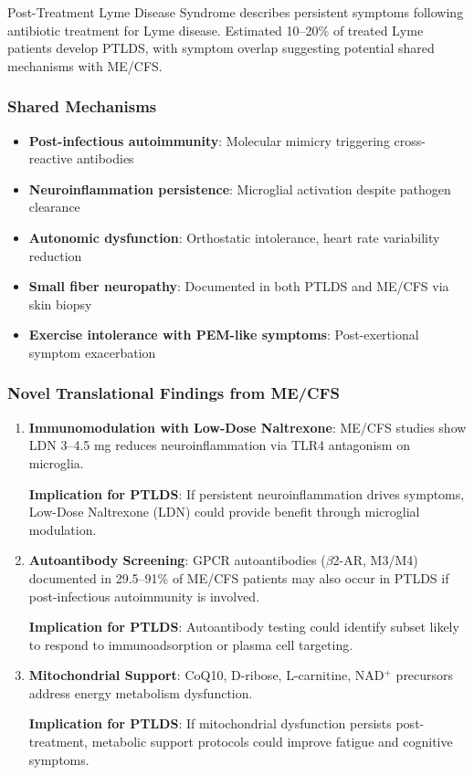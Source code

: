 Post-Treatment Lyme Disease Syndrome describes persistent symptoms following antibiotic treatment for Lyme disease. Estimated 10--20\% of treated Lyme patients develop PTLDS, with symptom overlap suggesting potential shared mechanisms with ME/CFS.

\subsubsection{Shared Mechanisms}

\begin{itemize}
    \item \textbf{Post-infectious autoimmunity}: Molecular mimicry triggering cross-reactive antibodies
    \item \textbf{Neuroinflammation persistence}: Microglial activation despite pathogen clearance
    \item \textbf{Autonomic dysfunction}: Orthostatic intolerance, heart rate variability reduction
    \item \textbf{Small fiber neuropathy}: Documented in both PTLDS and ME/CFS via skin biopsy
    \item \textbf{Exercise intolerance with PEM-like symptoms}: Post-exertional symptom exacerbation
\end{itemize}

\subsubsection{Novel Translational Findings from ME/CFS}

\begin{enumerate}
    \item \textbf{Immunomodulation with Low-Dose Naltrexone}: ME/CFS studies show LDN 3--4.5 mg reduces neuroinflammation via TLR4 antagonism on microglia.

    \textbf{Implication for PTLDS}: If persistent neuroinflammation drives symptoms, Low-Dose Naltrexone (LDN) could provide benefit through microglial modulation.

    \item \textbf{Autoantibody Screening}: GPCR autoantibodies ($\beta$2-AR, M3/M4) documented in 29.5--91\% of ME/CFS patients may also occur in PTLDS if post-infectious autoimmunity is involved.

    \textbf{Implication for PTLDS}: Autoantibody testing could identify subset likely to respond to immunoadsorption or plasma cell targeting.

    \item \textbf{Mitochondrial Support}: CoQ10, D-ribose, L-carnitine, NAD$^+$ precursors address energy metabolism dysfunction.

    \textbf{Implication for PTLDS}: If mitochondrial dysfunction persists post-treatment, metabolic support protocols could improve fatigue and cognitive symptoms.
\end{enumerate}

